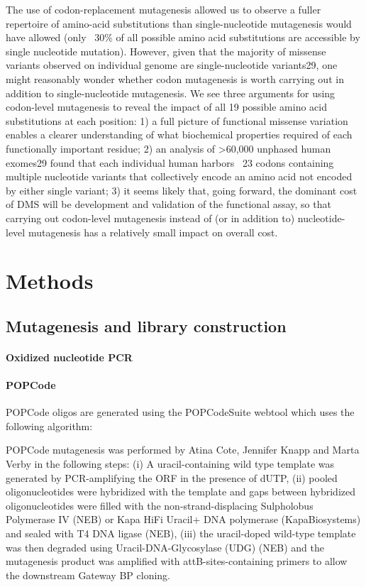 The use of codon-replacement mutagenesis allowed us to observe a fuller repertoire of amino-acid substitutions than single-nucleotide mutagenesis would have allowed (only ~30\% of all possible amino acid substitutions are accessible by single nucleotide mutation).  However, given that the majority of missense variants observed on individual genome are single-nucleotide variants29, one might reasonably wonder whether codon mutagenesis is worth carrying out in addition to single-nucleotide mutagenesis.  We see three arguments for using codon-level mutagenesis to reveal the impact of all 19 possible amino acid substitutions at each position:  1) a full picture of functional missense variation enables a clearer understanding of what biochemical properties required of each functionally important residue; 2) an analysis of >60,000 unphased human exomes29 found that each individual human harbors ~23 codons containing multiple nucleotide variants that collectively encode an amino acid not encoded by either single variant; 3) it seems likely that, going forward, the dominant cost of DMS will be development and validation of the functional assay, so that carrying out codon-level mutagenesis instead of (or in addition to) nucleotide-level mutagenesis has a relatively small impact on overall cost.


\section{Methods}

\subsection{Mutagenesis and library construction}

\paragraph{Oxidized nucleotide PCR}

\paragraph{POPCode}
POPCode oligos are generated using the POPCodeSuite webtool which uses the following algorithm: 

POPCode mutagenesis was performed by Atina Cote, Jennifer Knapp and Marta Verby in the following steps: (i) A uracil-containing wild type template was generated by PCR-amplifying the ORF in the presence of dUTP, (ii) pooled oligonucleotides were hybridized with the template and gaps between hybridized oligonucleotides were filled with the non-strand-displacing Sulpholobus Polymerase IV (NEB) or Kapa HiFi Uracil+ DNA polymerase (KapaBiosystems) and sealed with T4 DNA ligase (NEB), (iii) the uracil-doped wild-type template was then degraded using Uracil-DNA-Glycosylase (UDG) (NEB) and the mutagenesis product was amplified with attB-sites-containing primers to allow the downstream Gateway BP cloning.


